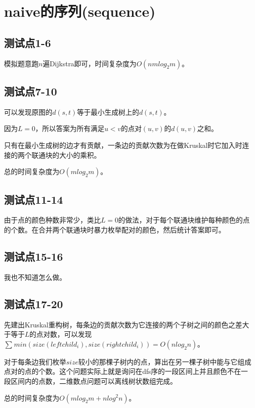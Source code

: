 \documentclass{ctexart}
\begin{document}
\newpage

\section{naive的序列(sequence)}

\subsection{测试点1-6}

模拟题意跑$n$遍Dijkstra即可，时间复杂度为$O(n m log_2{m})$。 \par

\subsection{测试点7-10}

可以发现原图的$d(s, t)$等于最小生成树上的$d(s, t)$。 \par
因为$L = 0$，所以答案为所有满足$u < v$的点对$(u, v)$的$d(u, v)$之和。\par
只有在最小生成树的边才有贡献，一条边的贡献次数为在做Kruskal时它加入时连接的两个联通块的大小的乘积。 \par
总的时间复杂度为$O(m log_2{m})$。\par

\subsection{测试点11-14}

由于点的颜色种数非常少，类比$L = 0$的做法，对于每个联通块维护每种颜色的点的个数。在合并两个联通块时暴力枚举配对的颜色，然后统计答案即可。 \par

\subsection{测试点15-16}

我也不知道怎么做。 \par

\subsection{测试点17-20}

先建出Kruskal重构树，每条边的贡献次数为它连接的两个子树之间的颜色之差大于等于$L$的点对数，可以发现$\sum_{}^{}{min(size(leftchild_i), size(rightchild_i))} = O(n log_2{n})$。 \par
对于每条边我们枚举$size$较小的那棵子树内的点，算出在另一棵子树中能与它组成点对的点的个数。这个问题实际上就是询问在dfs序的一段区间上并且颜色不在一段区间内的点数，二维数点问题可以离线树状数组完成。 \par
总的时间复杂度为$O(mlog_2{m} + nlog^2{n})$。 \par
\end{document}
